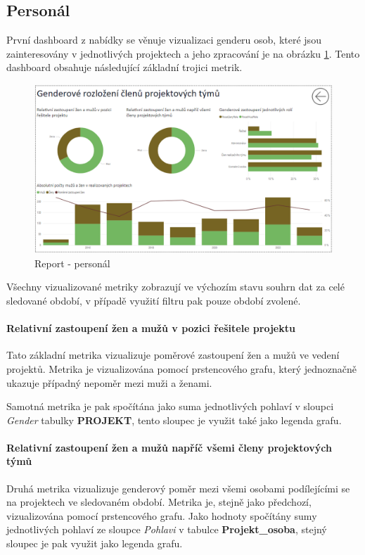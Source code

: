\documentclass[
  digital,     %
  twoside,     %
  lof,         %
  lot,         %
]{fithesis4}
\begin{document}
\subsection{Personál}
První dashboard z nabídky se věnuje vizualizaci genderu osob, které jsou zainteresovány v jednotlivých projektech a jeho zpracování je na obrázku \ref{fig:persons}. Tento dashboard obsahuje následující základní trojici metrik.
    \begin{figure}[t]
        \begin{center}
            \includegraphics[width=13cm]{img/persons.png}
        \end{center}
        \caption{Report - personál}
        \label{fig:persons}
    \end{figure}
Všechny vizualizované metriky zobrazují ve výchozím stavu souhrn dat za celé sledované období, v případě využití filtru pak pouze období zvolené.

\paragraph{Relativní zastoupení žen a mužů v pozici řešitele projektu}
Tato základní metrika vizualizuje poměrové zastoupení žen a mužů ve vedení projektů. Metrika je vizualizována pomocí prstencového grafu, který jednoznačně ukazuje případný nepoměr mezi muži a ženami.

Samotná metrika je pak spočítána jako suma jednotlivých pohlaví v sloupci \emph{Gender} tabulky \textbf{PROJEKT}, tento sloupec je využit také jako legenda grafu.

\paragraph{Relativní zastoupení žen a mužů napříč všemi členy projektových týmů}
Druhá metrika vizualizuje genderový poměr mezi všemi osobami podílejícími se na projektech ve sledovaném období. Metrika je, stejně jako předchozí, vizualizována pomocí prstencového grafu. Jako hodnoty spočítány sumy jednotlivých pohlaví ze sloupce \emph{Pohlavi} v tabulce \textbf{Projekt\_osoba}, stejný sloupec je pak využit jako legenda grafu. 
\end{document}
